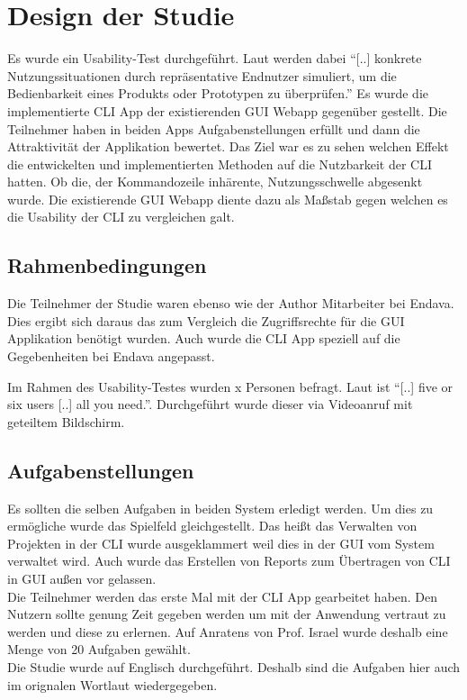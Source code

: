 \documentclass[oneside,bibliography=totocnumbered,BCOR=5mm]{scrbook}
\begin{document}
\section{Design der Studie}

Es wurde ein Usability-Test durchgeführt. Laut \cite[36]{henger2003} werden
dabei ``[..] konkrete Nutzungssituationen durch repräsentative Endnutzer
simuliert, um die Bedienbarkeit eines Produkts oder Prototypen zu überprüfen.''
Es wurde die implementierte CLI App der existierenden GUI Webapp gegenüber
gestellt. Die Teilnehmer haben in beiden Apps Aufgabenstellungen erfüllt und
dann die Attraktivität der Applikation bewertet. Das Ziel war es zu sehen
welchen Effekt die entwickelten und implementierten Methoden auf die Nutzbarkeit
der CLI hatten. Ob die, der Kommandozeile inhärente, Nutzungsschwelle abgesenkt
wurde. Die existierende GUI Webapp diente dazu als Maßstab gegen welchen es die
Usability der CLI zu vergleichen galt.

\subsection{Rahmenbedingungen}

Die Teilnehmer der Studie waren ebenso wie der Author Mitarbeiter bei
Endava. Dies ergibt sich daraus das zum Vergleich die Zugriffsrechte für die
GUI Applikation benötigt wurden. Auch wurde die CLI App speziell auf die
Gegebenheiten bei Endava angepasst.

Im Rahmen des Usability-Testes wurden x Personen befragt. Laut
\cite[11]{Spolsky_2001} ist ``[..] five or six users [..] all you need.''.
Durchgeführt wurde dieser via Videoanruf mit geteiltem Bildschirm.


\subsection{Aufgabenstellungen}
\label{aufgaben}

Es sollten die selben Aufgaben in beiden System erledigt werden. Um dies zu
ermögliche wurde das Spielfeld gleichgestellt. Das heißt das Verwalten von
Projekten in der CLI wurde ausgeklammert weil dies in der GUI vom System
verwaltet wird. Auch wurde das Erstellen von Reports zum Übertragen von CLI in
GUI außen vor gelassen.
\\
Die Teilnehmer werden das erste Mal mit der CLI App gearbeitet haben. Den
Nutzern sollte genung Zeit gegeben werden um mit der Anwendung vertraut zu
werden und diese zu erlernen. Auf Anratens von Prof. Israel wurde deshalb eine
Menge von 20 Aufgaben gewählt.
\\
Die Studie wurde auf Englisch durchgeführt. Deshalb sind die Aufgaben hier auch
im orignalen Wortlaut wiedergegeben.
\end{document}
